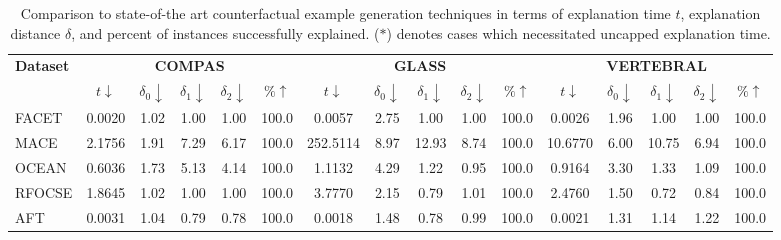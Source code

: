 \begin{table*}[t]
\small
\centering
\begin{tabularx}{0.95\textwidth}{|X|ccccc|ccccc|ccccc|}
\hline\textbf{Dataset} & \multicolumn{5}{c|}{\textbf{COMPAS}} & \multicolumn{5}{c|}{\textbf{GLASS}} & \multicolumn{5}{c|}{\textbf{VERTEBRAL}} \\
& $t\downarrow$ & $\delta_0\downarrow$ & $\delta_1\downarrow$ & $\delta_2\downarrow$ & $\%\uparrow$ & $t\downarrow$ & $\delta_0\downarrow$ & $\delta_1\downarrow$ & $\delta_2\downarrow$ & $\%\uparrow$ & $t\downarrow$ & $\delta_0\downarrow$ & $\delta_1\downarrow$ & $\delta_2\downarrow$ & $\%\uparrow$ \\
\hline
FACET & 0.0020 & 1.02 & 1.00 & 1.00 & 100.0 & 0.0057 & 2.75 & 1.00 & 1.00 & 100.0 & 0.0026 & 1.96 & 1.00 & 1.00 & 100.0 \\
MACE & 2.1756 & 1.91 & 7.29 & 6.17 & 100.0 & 252.5114 & 8.97 & 12.93 & 8.74 & 100.0 & 10.6770 & 6.00 & 10.75 & 6.94 & 100.0 \\
OCEAN & 0.6036 & 1.73 & 5.13 & 4.14 & 100.0 & 1.1132 & 4.29 & 1.22 & 0.95 & 100.0 & 0.9164 & 3.30 & 1.33 & 1.09 & 100.0 \\
RFOCSE & 1.8645 & 1.02 & 1.00 & 1.00 & 100.0 & 3.7770 & 2.15 & 0.79 & 1.01 & 100.0 & 2.4760 & 1.50 & 0.72 & 0.84 & 100.0 \\
AFT & 0.0031 & 1.04 & 0.79 & 0.78 & 100.0 & 0.0018 & 1.48 & 0.78 & 0.99 & 100.0 & 0.0021 & 1.31 & 1.14 & 1.22 & 100.0 \\
\hline
\end{tabularx}
\caption{Comparison to state-of-the art counterfactual example generation techniques in terms of explanation time $t$, explanation distance $\delta$, and percent of instances successfully explained. ($\ast$) denotes cases which necessitated uncapped explanation time.}
\label{tab.compare_methods}
\vspace{-7mm}
\end{table*}
